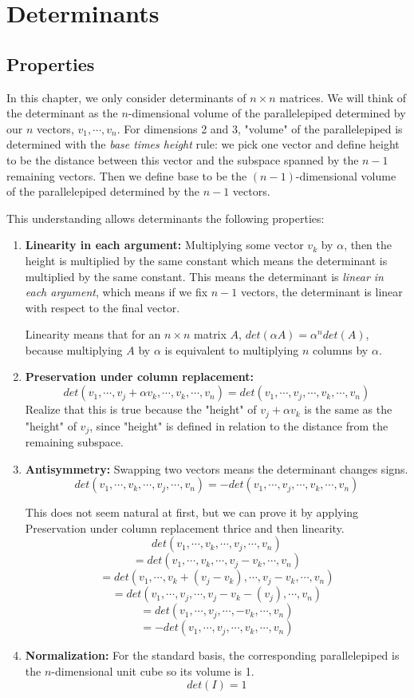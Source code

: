 \chapter{Determinants} 
\section{Properties}
In this chapter, we only consider determinants of $n \times n$ matrices. We will think of the determinant as the $n$-dimensional volume of the parallelepiped determined by our $n$ vectors, $v_{1}, \cdots, v_{n}$. For dimensions 2 and 3, "volume" of the parallelepiped is determined with the \textit{base times height} rule: we pick one vector and define height to be the distance between this vector and the subspace spanned by the $n - 1$ remaining vectors. Then we define base to be the $(n-1)$-dimensional volume of the parallelepiped determined by the $n-1$ vectors. 

This understanding allows determinants the following properties: 
\begin{enumerate}
	\item \textbf{Linearity in each argument: } Multiplying some vector $v_{k}$ by $\alpha$, then the height is multiplied by the same constant which means the determinant is multiplied by the same constant. This means the determinant is \textit{linear in each argument}, which means if we fix $n-1$ vectors, the determinant is linear with respect to the final vector. 
	
	Linearity means that for an $n \times n$ matrix $A$, $det(\alpha A) = \alpha^{n} det(A)$, because multiplying $A$ by $\alpha$ is equivalent to multiplying $n$ columns by $\alpha$. 
	\item \textbf{Preservation under column replacement: } 
	$$det(v_{1}, \cdots, v_{j} + \alpha v_{k}, \cdots, v_{k}, \cdots, v_{n}) = det(v_{1}, \cdots, v_{j}, \cdots, v_{k}, \cdots, v_{n})$$
	Realize that this is true because the "height" of $v_{j} + \alpha v_{k}$ is the same as the "height" of $v_{j}$, since "height" is defined in relation to the distance from the remaining subspace. 
	\item \textbf{Antisymmetry: } Swapping two vectors means the determinant changes signs. 
	$$det(v_{1}, \cdots, v_{k}, \cdots, v_{j}, \cdots, v_{n}) = -det(v_{1}, \cdots, v_{j}, \cdots, v_{k}, \cdots, v_{n})$$
	
This does not seem natural at first, but we can prove it by applying Preservation under column replacement thrice and then linearity. 
$$ det(v_{1}, \cdots, v_{k}, \cdots, v_{j}, \cdots, v_{n}) $$
$$= det(v_{1}, \cdots, v_{k}, \cdots, v_{j} - v_{k}, \cdots, v_{n}) $$
$$= det(v_{1}, \cdots, v_{k} + (v_{j} - v_{k}), \cdots, v_{j} - v_{k}, \cdots, v_{n}) $$
$$= det(v_{1}, \cdots, v_{j}, \cdots, v_{j} - v_{k} - (v_{j}), \cdots, v_{n}) $$
$$= det(v_{1}, \cdots, v_{j}, \cdots, -v_{k}, \cdots, v_{n}) $$
$$= -det(v_{1}, \cdots, v_{j}, \cdots, v_{k}, \cdots, v_{n}) $$

	\item \textbf{Normalization: } For the standard basis, the corresponding parallelepiped is the $n$-dimensional unit cube so its volume is 1. 
	$$det(I) = 1$$
\end{enumerate}

